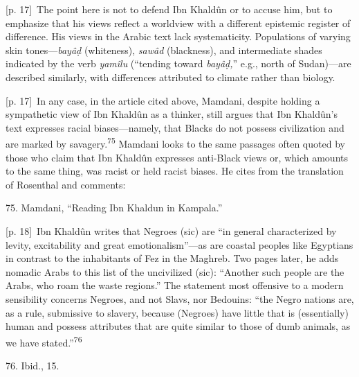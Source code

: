 \documentclass[10pt,a4paper]{article}
\begin{document}
{\scriptsize\color{gray} [p. 17]}\ The point here is not to defend Ibn Khaldûn or to accuse him, but to emphasize that his views reflect a worldview with a different epistemic register of difference. His views in the Arabic text lack systematicity. Populations of varying skin tones—\textit{bayâḍ} (whiteness), \textit{sawâd} (blackness), and intermediate shades indicated by the verb \textit{yamîlu} (“tending toward \textit{bayâḍ,}” e.g., north of Sudan)—are described similarly, with differences attributed to climate rather than biology.\par
{\scriptsize\color{gray} [p. 17]}\ In any case, in the article cited above, Mamdani, despite holding a sympathetic view of Ibn Khaldûn as a thinker, still argues that Ibn Khaldûn’s text expresses racial biases—namely, that Blacks do not possess civilization and are marked by savagery.\nobreak\textsuperscript{75} Mamdani looks to the same passages often quoted by those who claim that Ibn Khaldûn expresses anti-Black views or, which amounts to the same thing, was racist or held racist biases. He cites from the translation of Rosenthal and comments:\par{\small 75. Mamdani, “Reading Ibn Khaldun in Kampala.”\par}
{\scriptsize\color{gray} [p. 18]}\ Ibn Khaldûn writes that Negroes (sic) are “in general characterized by levity, excitability and great emotionalism”—as are coastal peoples like Egyptians in contrast to the inhabitants of Fez in the Maghreb. Two pages later, he adds nomadic Arabs to this list of the uncivilized (sic): “Another such people are the Arabs, who roam the waste regions.” The statement most offensive to a modern sensibility concerns Negroes, and not Slavs, nor Bedouins: “the Negro nations are, as a rule, submissive to slavery, because (Negroes) have little that is (essentially) human and possess attributes that are quite similar to those of dumb animals, as we have stated.”\nobreak\textsuperscript{76}\par{\small 76. Ibid., 15.\par}
\end{document}

